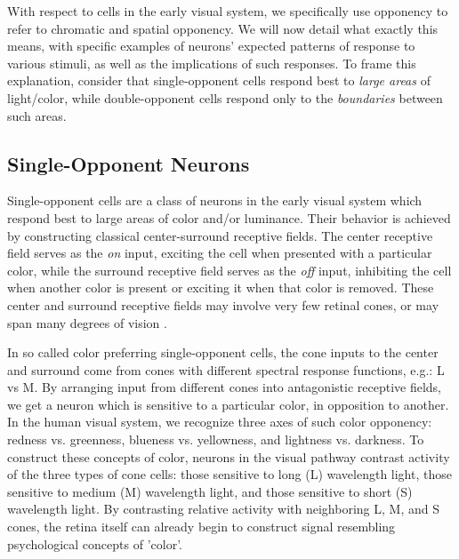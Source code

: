 \documentclass[journal,onecolumn]{IEEEtran}
\begin{document}
With respect to cells in the early visual system, we specifically use opponency to refer to chromatic and spatial opponency. We will now detail what exactly this means, with specific examples of neurons' expected patterns of response to various stimuli, as well as the implications of such responses. To frame this explanation, consider that single-opponent cells respond best to \textit{large areas} of light/color, while double-opponent cells respond only to the \textit{boundaries} between such areas.


\subsection*{Single-Opponent Neurons}

Single-opponent cells are a class of neurons in the early visual system which respond best to large areas of color and/or luminance. Their behavior is achieved by constructing classical center-surround receptive fields. The center receptive field serves as the \textit{on} input, exciting the cell when presented with a particular color, while the surround receptive field serves as the \textit{off} input, inhibiting the cell when another color is present or exciting it when that color is removed. These center and surround receptive fields may involve very few retinal cones, or may span many degrees of vision \cite{lennie:1991}.

In so called color preferring single-opponent cells, the cone inputs to the center and surround come from cones with different spectral response functions, e.g.: L vs M. By arranging input from different cones into antagonistic  receptive fields, we get a neuron which is sensitive to a particular color, in opposition to another. In the human visual system, we recognize three axes of such color opponency: redness vs. greenness, blueness vs. yellowness, and lightness vs. darkness. To construct these concepts of color, neurons in the visual pathway contrast activity of the three types of cone cells: those sensitive to long (L) wavelength light, those sensitive to medium (M) wavelength light, and those sensitive to short (S) wavelength light. By contrasting relative activity with neighboring L, M, and S cones, the retina itself can already begin to construct signal resembling psychological concepts of 'color'.
\end{document}
